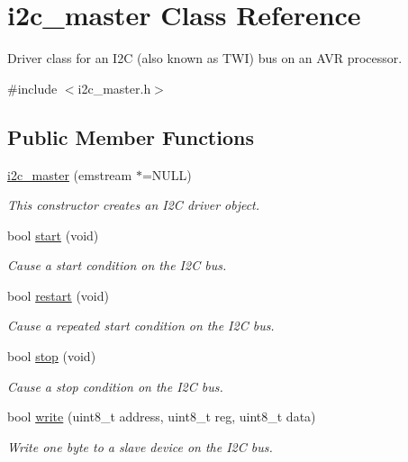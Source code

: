 \hypertarget{classi2c__master}{\section{i2c\-\_\-master Class Reference}
\label{classi2c__master}
}


Driver class for an I2\-C (also known as T\-W\-I) bus on an A\-V\-R processor.  




{\ttfamily \#include $<$i2c\-\_\-master.\-h$>$}

\subsection*{Public Member Functions}
\begin{DoxyCompactItemize}
\item 
\hyperlink{classi2c__master_a843928a7894ad896d1feace7fe734ad1}{i2c\-\_\-master} (emstream $\ast$=N\-U\-L\-L)
\begin{DoxyCompactList}\small\item\em This constructor creates an I2\-C driver object. \end{DoxyCompactList}\item 
bool \hyperlink{classi2c__master_ad69a2ec3ea33a2add78dcc07e7adce00}{start} (void)
\begin{DoxyCompactList}\small\item\em Cause a start condition on the I2\-C bus. \end{DoxyCompactList}\item 
bool \hyperlink{classi2c__master_a96d66784592f1e026dc42b29f21cdb64}{restart} (void)
\begin{DoxyCompactList}\small\item\em Cause a repeated start condition on the I2\-C bus. \end{DoxyCompactList}\item 
bool \hyperlink{classi2c__master_a3263bda1b2d48a751b9b798559600fe0}{stop} (void)
\begin{DoxyCompactList}\small\item\em Cause a stop condition on the I2\-C bus. \end{DoxyCompactList}\item 
bool \hyperlink{classi2c__master_ac73dfa0d112fb71ed34f42a222c4ecec}{write} (uint8\-\_\-t address, uint8\-\_\-t reg, uint8\-\_\-t data)
\begin{DoxyCompactList}\small\item\em Write one byte to a slave device on the I2\-C bus. \end{DoxyCompactList}\item 

\end{DoxyCompactItemize}
